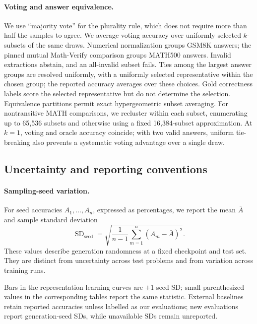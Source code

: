 \documentclass{article}
\newcommand{\rev}[1]{{\color{blue}#1}}
\begin{document}
\paragraph{Voting and answer equivalence.}
We use ``majority vote'' for the plurality rule, which does not require more than half the samples to agree. We average voting accuracy over uniformly selected $k$-subsets of the same draws. Numerical normalization groups GSM8K answers; the pinned mutual Math-Verify comparison groups MATH500 answers. Invalid extractions abstain, and an all-invalid subset fails. Ties among the largest answer groups are resolved uniformly, with a uniformly selected representative within the chosen group; the reported accuracy averages over these choices. Gold correctness labels score the selected representative but do not determine the selection. Equivalence partitions permit exact hypergeometric subset averaging. For nontransitive MATH comparisons, we recluster within each subset, enumerating up to 65,536 subsets and otherwise using a fixed 16,384-subset approximation. At $k=1$, voting and oracle accuracy coincide; with two valid answers, uniform tie-breaking also prevents a systematic voting advantage over a single draw.

\subsection{Uncertainty and reporting conventions}
\label{app:uncertainty}

\paragraph{Sampling-seed variation.}
For seed accuracies $A_1,\ldots,A_n$, expressed as percentages, we report the mean $\bar A$ and sample standard deviation
\[
  \operatorname{SD}_{\mathrm{seed}}=\sqrt{\frac{1}{n-1}\sum_{m=1}^{n}(A_m-\bar A)^2}.
\]
These values describe generation randomness at a fixed checkpoint and test set. They are distinct from uncertainty across test problems and from variation across training runs.

Bars in the representation learning curves are $\pm1$ seed SD; small parenthesized values in the corresponding tables report the same statistic. \rev{External baselines retain reported accuracies unless labelled as our evaluations; new evaluations report generation-seed SDs, while unavailable SDs remain unreported.}
\end{document}
